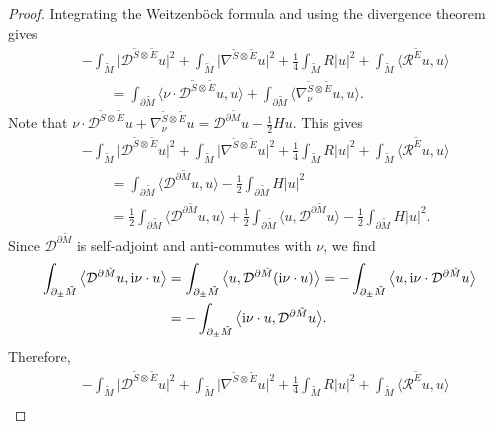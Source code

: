 \begin{proof}
Integrating the Weitzenb\"ock formula and using the divergence theorem gives
\begin{align*}
&- \int_{\tilde{M}} \big|\mathcal{D}^{\tilde{S} \otimes \tilde{E}} u\big|^2 + \int_{\tilde{M}} \big|\nabla^{\tilde{S} \otimes \tilde{E}} u\big|^2 + \frac{1}{4} \int_{\tilde{M}} R |u|^2 + \int_{\tilde{M}} \big\langle \mathcal{R}^{\tilde{E}} u,u \big\rangle \\
&\qquad= \int_{\partial \tilde{M}} \big\langle \nu \cdot \mathcal{D}^{\tilde{S} \otimes \tilde{E}} u,u \big\rangle + \int_{\partial \tilde{M}} \big\langle \nabla^{\tilde{S} \otimes \tilde{E}}_\nu u,u \big\rangle.
\end{align*}
Note that $\nu \cdot \mathcal{D}^{\tilde{S} \otimes \tilde{E}} u + \nabla^{\tilde{S} \otimes \tilde{E}}_\nu u = \mathcal{D}^{\partial \tilde{M}} u - \frac{1}{2} H u$.
This gives
\begin{align*}
&- \int_{\tilde{M}} \big|\mathcal{D}^{\tilde{S} \otimes \tilde{E}} u\big|^2 + \int_{\tilde{M}} \big|\nabla^{\tilde{S} \otimes \tilde{E}} u\big|^2 + \frac{1}{4} \int_{\tilde{M}} R |u|^2 + \int_{\tilde{M}} \big\langle \mathcal{R}^{\tilde{E}} u,u \big\rangle \\
&\qquad= \int_{\partial \tilde{M}} \big\langle \mathcal{D}^{\partial \tilde{M}} u,u \big\rangle - \frac{1}{2} \int_{\partial \tilde{M}} H |u|^2 \\
&\qquad= \frac{1}{2} \int_{\partial \tilde{M}} \big\langle \mathcal{D}^{\partial \tilde{M}} u,u \big\rangle + \frac{1}{2} \int_{\partial \tilde{M}} \big\langle u,\mathcal{D}^{\partial \tilde{M}} u \big\rangle - \frac{1}{2} \int_{\partial \tilde{M}} H |u|^2.
\end{align*}
Since $\mathcal{D}^{\partial \tilde{M}}$ is self-adjoint and anti-commutes with $\nu$, we find
\begin{align*}
\int_{\partial_\pm \tilde{M}} \big\langle \mathcal{D}^{\partial \tilde{M}} u,{\rm i} \nu \cdot u \big\rangle
&=
\int_{\partial_\pm \tilde{M}} \big\langle u,\mathcal{D}^{\partial \tilde{M}}({\rm i} \nu \cdot u) \big\rangle =
-\int_{\partial_\pm \tilde{M}} \big\langle u,{\rm i} \nu \cdot\mathcal{D}^{\partial \tilde{M}} u \big\rangle \\
&=
-\int_{\partial_\pm \tilde{M}} \big\langle {\rm i} \nu \cdot u,\mathcal{D}^{\partial \tilde{M}} u \big\rangle .
\end{align*}
Therefore,
\begin{align}
& - \int_{\tilde{M}}\big|\mathcal{D}^{\tilde{S} \otimes \tilde{E}} u\big|^2 + \int_{\tilde{M}} \big|\nabla^{\tilde{S} \otimes \tilde{E}} u\big|^2 + \frac{1}{4} \int_{\tilde{M}} R |u|^2 + \int_{\tilde{M}} \big\langle \mathcal{R}^{\tilde{E}} u,u \big\rangle \nonumber\\

\end{align}
\end{proof}
